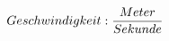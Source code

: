 \documentclass[preview]{standalone}
\begin{document}
\begin{align*}
\special{dvisvgm:raw <g id='unique000'>}Geschwindigkeit: \frac{Meter}{Sekunde}\special{dvisvgm:raw </g>}
\end{align*}
\end{document}
